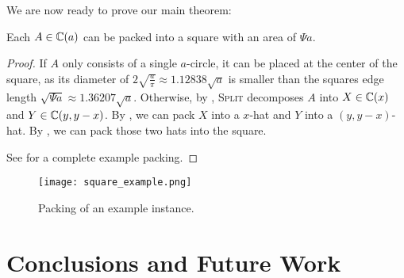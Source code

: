 \documentclass[%
    a4paper,              %
    style=print,          %
    bibliography=totoc,   %
    nexus,                %
    lnum,                 %
    extramargin,          %
]{tubsbook}
\begin{document}
We are now ready to prove our main theorem:

\begin{theorem}\label{th:circlesinsquare}
    Each $A \in \mathbb{C}(a)$ can be packed into a square with an area of $\Psi a$.
\end{theorem}

\begin{proof}
    If $A$ only consists of a single $a$-circle, it can be placed at the center of the square, as its diameter of $2\sqrt{\frac{a}{\pi}} \approx 1.12838\sqrt{a}$ is smaller than the squares edge length $\sqrt{\Psi a} \approx 1.36207\sqrt{a}$. Otherwise, by , \textsc{Split} decomposes $A$ into $X \in \mathbb{C}(x)$ and $Y \in \mathbb{C}(y,y-x)$. By , we can pack $X$ into a $x$-hat and $Y$ into a $(y,y-x)$-hat. By , we can pack those two hats into the square.

    See  for a complete example packing.
\end{proof}

\begin{figure}[htb]
    \centering
    \texttt{[image: square\_example.png]}
    \caption{Packing of an example instance.}
    \label{fig:example}
\end{figure}

\chapter{Conclusions and Future Work}

\appendix
\end{document}
